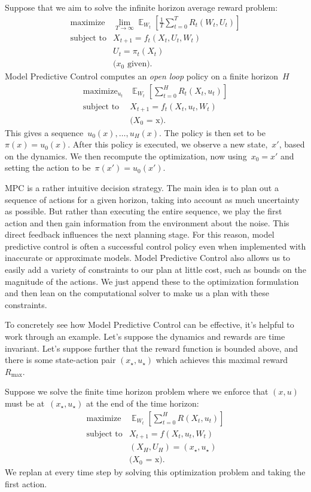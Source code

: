 \documentclass{tufte-book}
\begin{document}
Suppose that we aim to solve the infinite horizon average reward
problem: \[
\begin{array}{ll}
\text{maximize} & \lim_{T\rightarrow \infty} \mathop\mathbb{E}_{W_t}[\frac{1}{T}\sum_{t=0}^T R_t(W_t,U_t) ]\\
\text{subject to} & X_{t+1} = f_t(X_t, U_t, W_t)\\
& U_t = \pi_t(X_t)\\
& \text{($x_0$ given).}
\end{array}
\] Model Predictive Control computes an \emph{open loop} policy on a
finite horizon~\(H\) \[
\begin{array}{ll}
\text{maximize}_{u_t} & \mathop\mathbb{E}_{W_t}[ \sum_{t=0}^H R_t(X_t,u_t)]\\
\text{subject to} & X_{t+1} = f_t(X_t, u_t, W_t)\\
& \text{($X_0$ = x).}
\end{array}
\] This gives a sequence~\(u_0(x),\ldots, u_H(x)\). The policy is then
set to be~\(\pi(x)=u_0(x)\). After this policy is executed, we observe a
new state,~\(x'\), based on the dynamics. We then recompute the
optimization, now using~\(x_0=x'\) and setting the action to
be~\(\pi(x')= u_0(x')\).

MPC is a rather intuitive decision strategy. The main idea is to plan
out a sequence of actions for a given horizon, taking into account as
much uncertainty as possible. But rather than executing the entire
sequence, we play the first action and then gain information from the
environment about the noise. This direct feedback influences the next
planning stage. For this reason, model predictive control is often a
successful control policy even when implemented with inaccurate or
approximate models. Model Predictive Control also allows us to easily
add a variety of constraints to our plan at little cost, such as bounds
on the magnitude of the actions. We just append these to the
optimization formulation and then lean on the computational solver to
make us a plan with these constraints.

To concretely see how Model Predictive Control can be effective, it's
helpful to work through an example. Let's suppose the dynamics and
rewards are time invariant. Let's suppose further that the reward
function is bounded above, and there is some state-action pair
\((x_\star,u_\star)\) which achieves this maximal
reward~\(R_\mathrm{max}\).

Suppose we solve the finite time horizon problem where we enforce that
\((x,u)\) must be at~\((x_\star,u_\star)\) at the end of the time
horizon: \[
\begin{array}{ll}
\text{maximize} & \mathop\mathbb{E}_{W_t}[ \sum_{t=0}^H R(X_t,u_t)]\\
\text{subject to} & X_{t+1} = f(X_t, u_t, W_t)\\
& (X_H,U_H) = (x_\star,u_\star)\\
& \text{($X_0$ = x).}
\end{array}
\] We replan at every time step by solving this optimization problem and
taking the first action.
\end{document}
